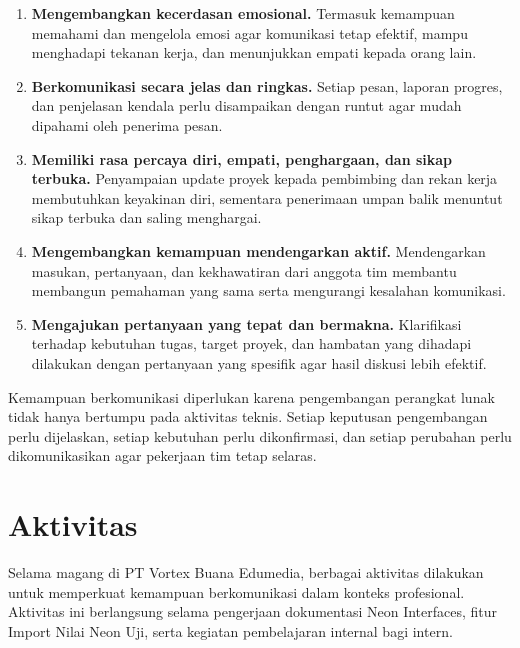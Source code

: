 \begin{enumerate}
    \item \textbf{Mengembangkan kecerdasan emosional.} Termasuk kemampuan memahami dan mengelola emosi agar komunikasi tetap efektif, mampu menghadapi tekanan kerja, dan menunjukkan empati kepada orang lain.
    \item \textbf{Berkomunikasi secara jelas dan ringkas.} Setiap pesan, laporan progres, dan penjelasan kendala perlu disampaikan dengan runtut agar mudah dipahami oleh penerima pesan.
    \item \textbf{Memiliki rasa percaya diri, empati, penghargaan, dan sikap terbuka.} Penyampaian update proyek kepada pembimbing dan rekan kerja membutuhkan keyakinan diri, sementara penerimaan umpan balik menuntut sikap terbuka dan saling menghargai.
    \item \textbf{Mengembangkan kemampuan mendengarkan aktif.} Mendengarkan masukan, pertanyaan, dan kekhawatiran dari anggota tim membantu membangun pemahaman yang sama serta mengurangi kesalahan komunikasi.
    \item \textbf{Mengajukan pertanyaan yang tepat dan bermakna.} Klarifikasi terhadap kebutuhan tugas, target proyek, dan hambatan yang dihadapi dilakukan dengan pertanyaan yang spesifik agar hasil diskusi lebih efektif.
\end{enumerate}

Kemampuan berkomunikasi diperlukan karena pengembangan perangkat lunak tidak hanya bertumpu pada aktivitas teknis. Setiap keputusan pengembangan perlu dijelaskan, setiap kebutuhan perlu dikonfirmasi, dan setiap perubahan perlu dikomunikasikan agar pekerjaan tim tetap selaras.

\section{Aktivitas}
Selama magang di PT Vortex Buana Edumedia, berbagai aktivitas dilakukan untuk memperkuat kemampuan berkomunikasi dalam konteks profesional. Aktivitas ini berlangsung selama pengerjaan dokumentasi Neon Interfaces, fitur Import Nilai Neon Uji, serta kegiatan pembelajaran internal bagi intern.

